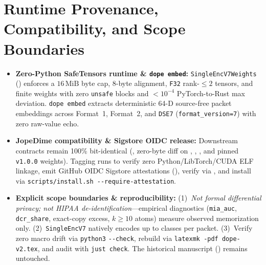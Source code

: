 \documentclass[10pt,letterpaper]{article}
\begin{document}
\section{Runtime Provenance, Compatibility, and Scope Boundaries}
\begin{itemize}[leftmargin=1.3em,itemsep=2pt]
  \item \textbf{Zero-Python SafeTensors runtime \& \texttt{dope embed}:} \texttt{SingleEncV7Weights} () enforces a $16\,\text{MiB}$ byte cap, 8-byte alignment, \texttt{F32} rank-$\le 2$ tensors, and finite weights with zero \texttt{unsafe} blocks and $<10^{-4}$ PyTorch-to-Rust max deviation. \texttt{dope embed} extracts deterministic 64-D source-free packet embeddings across Format~1, Format~2, and \texttt{DSE7} (\texttt{format\_version=7}) with zero raw-value echo.
  \item \textbf{JopeDime compatibility \& Sigstore OIDC release:} Downstream contracts remain 100\% bit-identical (, zero-byte diff on , , , and pinned \texttt{v1.0.0} weights). Tagging \texttt{} runs  to verify zero Python/LibTorch/CUDA ELF linkage, emit GitHub OIDC Sigstore attestations (), verify via , and install via \texttt{scripts/install.sh -{}-require-attestation}.
  \item \textbf{Explicit scope boundaries \& reproducibility:} (1)~\emph{Not formal differential privacy; not HIPAA de-identification}---empirical diagnostics (\texttt{mia\_auc}, \texttt{dcr\_share}, exact-copy excess, $k\ge 10$ atoms) measure observed memorization only. (2)~\texttt{SingleEncV7} natively encodes up to  classes per packet. (3)~Verify zero macro drift via \texttt{python3}  \texttt{-{}-check}, rebuild via \texttt{latexmk -pdf dope-v2.tex}, and audit with \texttt{just check}. The historical manuscript () remains untouched.
\end{itemize}



\end{document}
